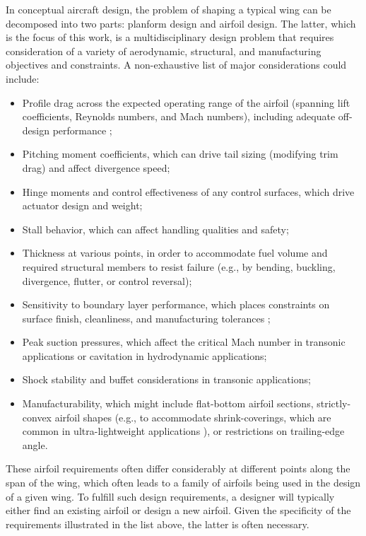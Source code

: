\documentclass[conf]{new-aiaa}
\begin{document}
    In conceptual aircraft design, the problem of shaping a typical wing can be decomposed into two parts: planform design and airfoil design. The latter, which is the focus of this work, is a multidisciplinary design problem that requires consideration of a variety of aerodynamic, structural, and manufacturing objectives and constraints. A non-exhaustive list of major considerations could include:
    \begin{itemize}
        \item Profile drag across the expected operating range of the airfoil (spanning lift coefficients, Reynolds numbers, and Mach numbers), including adequate off-design performance \cite{drela_pros_1998};
        \item Pitching moment coefficients, which can drive tail sizing (modifying trim drag) and affect divergence speed;
        \item Hinge moments and control effectiveness of any control surfaces, which drive actuator design and weight;
        \item Stall behavior, which can affect handling qualities and safety;
        \item Thickness at various points, in order to accommodate fuel volume and required structural members to resist failure (e.g., by bending, buckling, divergence, flutter, or control reversal);\cite{sharpe_tailerons_2023}
        \item Sensitivity to boundary layer performance, which places constraints on surface finish, cleanliness, and manufacturing tolerances \cite{eleshaky1993airfoil, selig_highlift_1997, liebeck1973class};
        \item Peak suction pressures, which affect the critical Mach number in transonic applications or cavitation in hydrodynamic applications;
        \item Shock stability and buffet considerations in transonic applications;
        \item Manufacturability, which might include flat-bottom airfoil sections, strictly-convex airfoil shapes (e.g., to accommodate shrink-coverings, which are common in ultra-lightweight applications \cite{drela_lowreynoldsnumber_1988}), or restrictions on trailing-edge angle.
    \end{itemize}

    These airfoil requirements often differ considerably at different points along the span of the wing, which often leads to a family of airfoils being used in the design of a given wing. To fulfill such design requirements, a designer will typically either find an existing airfoil or design a new airfoil. Given the specificity of the requirements illustrated in the list above, the latter is often necessary.
\end{document}
